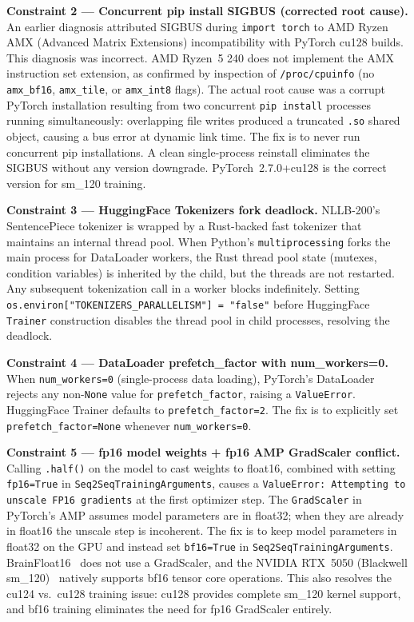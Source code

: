 \documentclass[conference]{IEEEtran}
\begin{document}
\textbf{Constraint 2 --- Concurrent pip install SIGBUS (corrected root cause).}
An earlier diagnosis attributed SIGBUS during \texttt{import torch} to AMD Ryzen AMX
(Advanced Matrix Extensions) incompatibility with PyTorch cu128 builds.
This diagnosis was incorrect. AMD Ryzen~5 240 does not implement the AMX instruction
set extension, as confirmed by inspection of \texttt{/proc/cpuinfo} (no \texttt{amx\_bf16},
\texttt{amx\_tile}, or \texttt{amx\_int8} flags).
The actual root cause was a corrupt PyTorch installation resulting from two concurrent
\texttt{pip install} processes running simultaneously: overlapping file writes produced
a truncated \texttt{.so} shared object, causing a bus error at dynamic link time.
The fix is to never run concurrent pip installations. A clean single-process reinstall
eliminates the SIGBUS without any version downgrade. PyTorch~2.7.0+cu128 is the
correct version for sm\_120 training.

\textbf{Constraint 3 --- HuggingFace Tokenizers fork deadlock.}
NLLB-200's SentencePiece tokenizer is wrapped by a Rust-backed fast tokenizer
that maintains an internal thread pool. When Python's \texttt{multiprocessing}
forks the main process for DataLoader workers, the Rust thread pool state
(mutexes, condition variables) is inherited by the child, but the threads are not
restarted. Any subsequent tokenization call in a worker blocks indefinitely.
Setting \texttt{os.environ["TOKENIZERS\_PARALLELISM"] = "false"} before
HuggingFace \texttt{Trainer} construction disables the thread pool in child
processes, resolving the deadlock.

\textbf{Constraint 4 --- DataLoader prefetch\_factor with num\_workers=0.}
When \texttt{num\_workers=0} (single-process data loading), PyTorch's DataLoader
rejects any non-\texttt{None} value for \texttt{prefetch\_factor}, raising a
\texttt{ValueError}. HuggingFace Trainer defaults to \texttt{prefetch\_factor=2}.
The fix is to explicitly set \texttt{prefetch\_factor=None} whenever
\texttt{num\_workers=0}.

\textbf{Constraint 5 --- fp16 model weights + fp16 AMP GradScaler conflict.}
Calling \texttt{.half()} on the model to cast weights to float16, combined with
setting \texttt{fp16=True} in \texttt{Seq2SeqTrainingArguments}, causes a
\texttt{ValueError: Attempting to unscale FP16 gradients} at the first optimizer step.
The \texttt{GradScaler} in PyTorch's AMP assumes model parameters are in float32; when
they are already in float16 the unscale step is incoherent.
The fix is to keep model parameters in float32 on the GPU and instead set
\texttt{bf16=True} in \texttt{Seq2SeqTrainingArguments}. BrainFloat16~\cite{micikevicius2018mixed}
does not use a GradScaler, and the NVIDIA RTX~5050 (Blackwell sm\_120)~\cite{nvidia_blackwell}
natively supports bf16 tensor core operations. This also resolves the cu124 vs.\ cu128
training issue: cu128 provides complete sm\_120 kernel support, and bf16 training
eliminates the need for fp16 GradScaler entirely.
\end{document}
